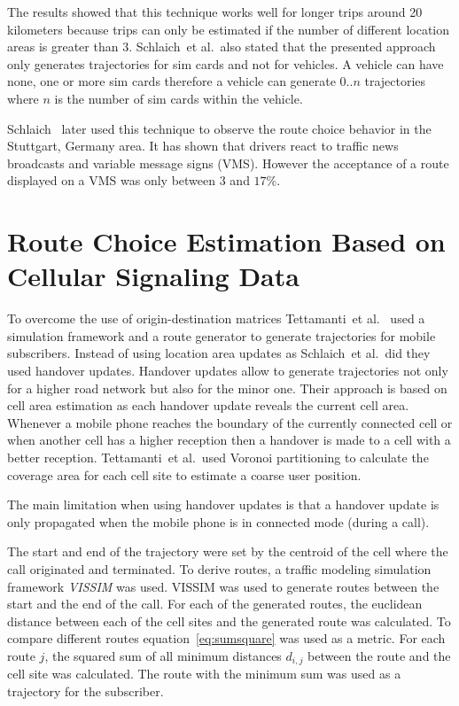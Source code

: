 \documentclass[master,english]{hgbthesis}
\begin{document}
The results showed that this technique works well for longer trips around 20 kilometers because trips can only be estimated if the number of different location areas is greater than 3. Schlaich~et al.\ also stated that the presented approach only generates trajectories for sim cards and not for vehicles. A vehicle can have none, one or more sim cards therefore a vehicle can generate $0..n$ trajectories where $n$ is the number of sim cards within the vehicle.

Schlaich~\cite{Schlaich2010} later used this technique to observe the route choice behavior in the Stuttgart, Germany area. It has shown that drivers react to traffic news broadcasts and variable message signs (VMS). However the acceptance of a route displayed on a VMS was only between $3$ and $17\%$.

\section{Route Choice Estimation Based on Cellular Signaling Data}

To overcome the use of origin-destination matrices Tettamanti~et al.\ \cite{Tettamanti2012} used a simulation framework and a route generator to generate trajectories for mobile subscribers. Instead of using location area updates as Schlaich~et al.\ did they used handover updates. Handover updates allow to generate trajectories not only for a higher road network but also for the minor one. Their approach is based on cell area estimation as each handover update reveals the current cell area. Whenever a mobile phone reaches the boundary of the currently connected cell or when another cell has a higher reception then a handover is made to a cell with a better reception. Tettamanti~et al.\ used Voronoi partitioning to calculate the coverage area for each cell site to estimate a coarse user position.

The main limitation when using handover updates is that a handover update is only propagated when the mobile phone is in connected mode (during a call).

The start and end of the trajectory were set by the centroid of the cell where the call originated and terminated. To derive routes, a traffic modeling simulation framework \emph{VISSIM} was used. VISSIM was used to generate routes between the start and the end of the call. For each of the generated routes, the euclidean distance between each of the cell sites and the generated route was calculated. To compare different routes equation~\ref{eq:sumsquare} was used  as a metric. For each route $j$, the squared sum of all minimum distances $d_{i,j}$ between the route and the cell site was calculated. The route with the minimum sum was used as a trajectory for the subscriber.
\end{document}
